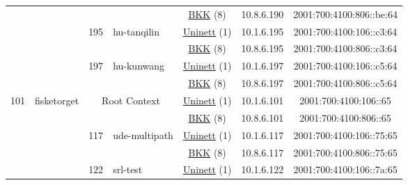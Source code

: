 \begin{small}
\begin{center}
\begin{longtable}{|c|c|c|c|c|c|c|c|}
  &  &  &  & \multicolumn{2}{|c|}{\tiny{\href{http://bkk.no}{BKK} (8)}} & \tiny{10.8.6.190} & \tiny{2001:700:4100:806::be:64} \\* \cline{3-3}\cline{4-4}\cline{5-5}\cline{6-6}\cline{7-7}\cline{8-8}
  &  & \multirow{2}{*}{\tiny{195}} & \multicolumn{1}{|l|}{\multirow{2}{*}{\tiny{hu-tanqilin}}} & \multicolumn{2}{|c|}{\tiny{\href{https://www.uninett.no}{Uninett} (1)}} & \tiny{10.1.6.195} & \tiny{2001:700:4100:106::c3:64} \\* \cline{5-5}\cline{6-6}\cline{7-7}\cline{8-8}
  &  &  &  & \multicolumn{2}{|c|}{\tiny{\href{http://bkk.no}{BKK} (8)}} & \tiny{10.8.6.195} & \tiny{2001:700:4100:806::c3:64} \\* \cline{3-3}\cline{4-4}\cline{5-5}\cline{6-6}\cline{7-7}\cline{8-8}
  &  & \multirow{2}{*}{\tiny{197}} & \multicolumn{1}{|l|}{\multirow{2}{*}{\tiny{hu-kunwang}}} & \multicolumn{2}{|c|}{\tiny{\href{https://www.uninett.no}{Uninett} (1)}} & \tiny{10.1.6.197} & \tiny{2001:700:4100:106::c5:64} \\* \cline{5-5}\cline{6-6}\cline{7-7}\cline{8-8}
  &  &  &  & \multicolumn{2}{|c|}{\tiny{\href{http://bkk.no}{BKK} (8)}} & \tiny{10.8.6.197} & \tiny{2001:700:4100:806::c5:64} \\ \hline
 \multirow{34}{*}{\tiny{101}} & \multicolumn{1}{|l|}{\multirow{34}{*}{\tiny{fisketorget}}} & \multicolumn{2}{|c|}{\multirow{2}{*}{\tiny{Root Context}}} & \multicolumn{2}{|c|}{\tiny{\href{https://www.uninett.no}{Uninett} (1)}} & \tiny{10.1.6.101} & \tiny{2001:700:4100:106::65} \\* \cline{5-5}\cline{6-6}\cline{7-7}\cline{8-8}
  &  & \multicolumn{2}{|c|}{} & \multicolumn{2}{|c|}{\tiny{\href{http://bkk.no}{BKK} (8)}} & \tiny{10.8.6.101} & \tiny{2001:700:4100:806::65} \\* \cline{3-3}\cline{4-4}\cline{5-5}\cline{6-6}\cline{7-7}\cline{8-8}
  &  & \multirow{2}{*}{\tiny{117}} & \multicolumn{1}{|l|}{\multirow{2}{*}{\tiny{ude-multipath}}} & \multicolumn{2}{|c|}{\tiny{\href{https://www.uninett.no}{Uninett} (1)}} & \tiny{10.1.6.117} & \tiny{2001:700:4100:106::75:65} \\* \cline{5-5}\cline{6-6}\cline{7-7}\cline{8-8}
  &  &  &  & \multicolumn{2}{|c|}{\tiny{\href{http://bkk.no}{BKK} (8)}} & \tiny{10.8.6.117} & \tiny{2001:700:4100:806::75:65} \\* \cline{3-3}\cline{4-4}\cline{5-5}\cline{6-6}\cline{7-7}\cline{8-8}
  &  & \multirow{2}{*}{\tiny{122}} & \multicolumn{1}{|l|}{\multirow{2}{*}{\tiny{srl-test}}} & \multicolumn{2}{|c|}{\tiny{\href{https://www.uninett.no}{Uninett} (1)}} & \tiny{10.1.6.122} & \tiny{2001:700:4100:106::7a:65} \\* \cline{5-5}\cline{6-6}\cline{7-7}\cline{8-8}

\end{longtable}
\end{center}
\end{small}
